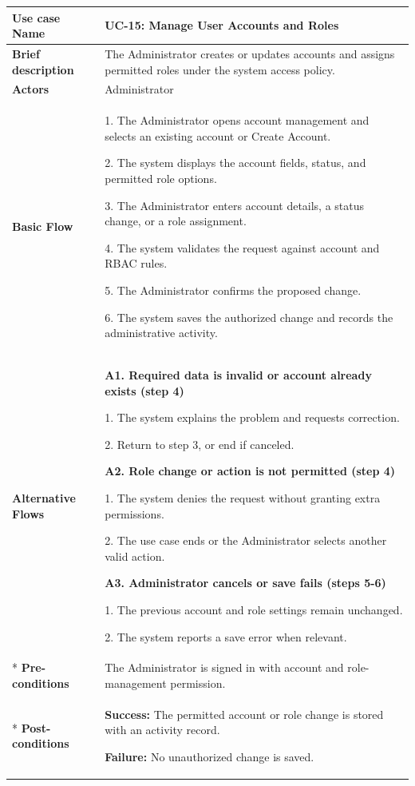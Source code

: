 \begin{longtable}{|p{}|p{}|}
\hline
\textbf{Use case Name} & UC-15: Manage User Accounts and Roles \\ \hline
\textbf{Brief description} & The Administrator creates or updates accounts and assigns permitted roles under the system access policy. \\ \hline
\textbf{Actors} & Administrator \\ \hline
\textbf{Basic Flow} &
1. The Administrator opens account management and selects an existing account or Create Account.\par
2. The system displays the account fields, status, and permitted role options.\par
3. The Administrator enters account details, a status change, or a role assignment.\par
4. The system validates the request against account and RBAC rules.\par
5. The Administrator confirms the proposed change.\par
6. The system saves the authorized change and records the administrative activity.
\\ \hline
\textbf{Alternative Flows} &
\textbf{A1. Required data is invalid or account already exists (step 4)}\par
1. The system explains the problem and requests correction.\par
2. Return to step 3, or end if canceled.
\par
\textbf{A2. Role change or action is not permitted (step 4)}\par
1. The system denies the request without granting extra permissions.\par
2. The use case ends or the Administrator selects another valid action.
\par
\textbf{A3. Administrator cancels or save fails (steps 5-6)}\par
1. The previous account and role settings remain unchanged.\par
2. The system reports a save error when relevant.
\\* \hline
\textbf{Pre-conditions} & The Administrator is signed in with account and role-management permission. \\* \hline
\textbf{Post-conditions} & \textbf{Success:} The permitted account or role change is stored with an activity record.\par
\textbf{Failure:} No unauthorized change is saved. \\ \hline
\end{longtable}

